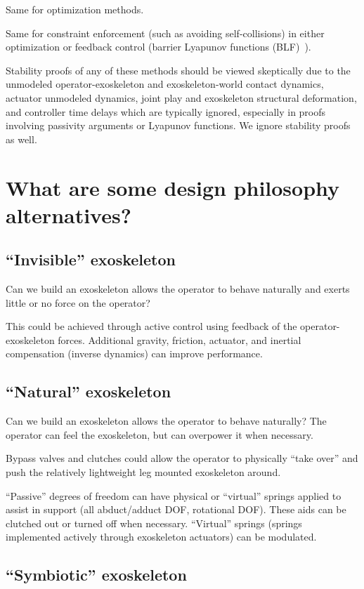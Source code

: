 \documentclass[letterpaper,12pt,fullpage]{article}
\begin{document}
Same for optimization methods.

Same for constraint enforcement (such as avoiding self-collisions)
in either optimization or feedback control (barrier
Lyapunov functions (BLF)~\cite{IEEE06911561}).

Stability proofs of any of these methods should be viewed skeptically due
to the unmodeled operator-exoskeleton and exoskeleton-world contact dynamics, 
actuator unmodeled dynamics, joint play and exoskeleton
structural deformation, and controller
time delays which are typically ignored, especially in proofs involving
passivity arguments or Lyapunov functions.
We ignore stability proofs as well.

\section{What are some design philosophy alternatives?}

\subsection{``Invisible'' exoskeleton}

Can we build an exoskeleton allows the operator to behave naturally
and exerts little or no force on the operator?

This could be achieved through active control using feedback of the
operator-exoskeleton forces. Additional gravity, friction, actuator, and
inertial compensation (inverse dynamics) can improve performance.

\subsection{``Natural'' exoskeleton}

Can we build an exoskeleton allows the operator to behave naturally?
The operator can feel the exoskeleton, but can overpower it when necessary.

Bypass valves and clutches could allow the operator to physically ``take over''
and push the relatively lightweight leg mounted exoskeleton around.

``Passive'' degrees of freedom can have physical or ``virtual'' springs
applied to assist in support (all abduct/adduct DOF, rotational DOF).
These aids can be clutched out or turned off when necessary.
``Virtual'' springs (springs implemented actively through exoskeleton
actuators) can be modulated.

\subsection{``Symbiotic'' exoskeleton}
\end{document}

